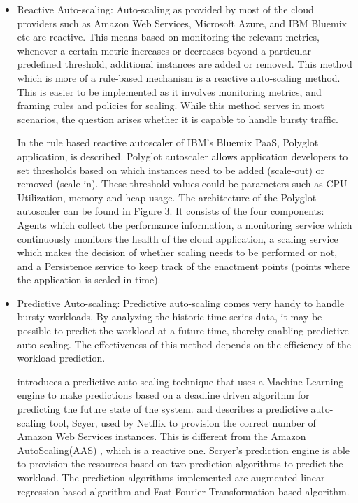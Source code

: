 \documentclass[article,type=msc,colorback,12pt,accentcolor=tud7b,table]{tudthesis}
\begin{document}
	\begin{itemize}
	
	\item{Reactive Auto-scaling: }Auto-scaling as provided by most of the cloud providers such as Amazon Web Services, Microsoft Azure, and IBM Bluemix etc are reactive. This means based on monitoring the relevant metrics, whenever a certain metric increases or decreases beyond a particular predefined threshold, additional instances are added or removed. This method which is more of a rule-based mechanism is a reactive auto-scaling method. This is easier to be implemented as it involves monitoring metrics, and framing rules and policies for scaling. While this method serves in most scenarios, the question arises whether it is capable to handle bursty traffic.
	
	In \cite{seelam2015polyglot} the rule based reactive autoscaler of IBM's Bluemix PaaS, Polyglot application, is described. Polyglot autoscaler allows application developers to set thresholds based on which instances need to be added (scale-out) or removed (scale-in). These threshold values could be parameters such as CPU Utilization, memory and heap usage. The architecture of the Polyglot autoscaler can be found in Figure 3. It consists of the four components: Agents which collect the performance information, a monitoring service which continuously monitors the health of the cloud application, a scaling service which makes the decision of whether scaling needs to be performed or not, and a Persistence service to keep track of the enactment points (points where the application is scaled in time).  

\item{Predictive Auto-scaling: }Predictive auto-scaling comes very handy to handle bursty workloads. By analyzing the historic time series data, it may be possible to predict the workload at a future time, thereby enabling predictive auto-scaling. The effectiveness of this method depends on the efficiency of the workload prediction.

\cite{biswas2015predictive} introduces a predictive auto scaling technique that uses a Machine Learning engine to make predictions based on a deadline driven algorithm for predicting the future state of the system. \cite{Scryer1} and \cite{Scryer2} describes a predictive auto-scaling tool, Scyer, used by Netflix to provision the correct number of Amazon Web Services \cite{aws} instances. This is different from the Amazon AutoScaling(AAS) \cite{aas}, which is a reactive one. Scryer's prediction engine is able to provision the resources based on two prediction algorithms to predict the workload. The prediction algorithms implemented are augmented linear regression based algorithm and Fast Fourier Transformation based algorithm.


\end{itemize}
\end{document}
